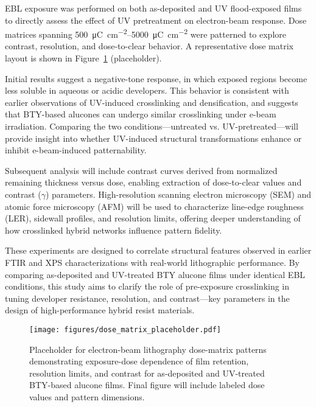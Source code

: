EBL exposure was performed on both as-deposited and UV flood-exposed films to directly assess the effect of UV pretreatment on electron-beam response. Dose matrices spanning \SIrange{500}{5000}{\micro\coulomb\per\centi\meter\squared} were patterned to explore contrast, resolution, and dose-to-clear behavior. A representative dose matrix layout is shown in Figure~\ref{fig:dose_matrix} (placeholder).

Initial results suggest a negative-tone response, in which exposed regions become less soluble in aqueous or acidic developers. This behavior is consistent with earlier observations of UV-induced crosslinking and densification, and suggests that BTY-based alucones can undergo similar crosslinking under e-beam irradiation. Comparing the two conditions—untreated vs. UV-pretreated—will provide insight into whether UV-induced structural transformations enhance or inhibit e-beam-induced patternability.

Subsequent analysis will include contrast curves derived from normalized remaining thickness versus dose, enabling extraction of dose-to-clear values and contrast (\(\gamma\)) parameters. High-resolution scanning electron microscopy (SEM) and atomic force microscopy (AFM) will be used to characterize line-edge roughness (LER), sidewall profiles, and resolution limits, offering deeper understanding of how crosslinked hybrid networks influence pattern fidelity.


These experiments are designed to correlate structural features observed in earlier FTIR and XPS characterizations with real-world lithographic performance. By comparing as-deposited and UV-treated BTY alucone films under identical EBL conditions, this study aims to clarify the role of pre-exposure crosslinking in tuning developer resistance, resolution, and contrast—key parameters in the design of high-performance hybrid resist materials.

\begin{figure}[ht]
  \centering
  \texttt{[image: figures/dose\_matrix\_placeholder.pdf]}
  \caption{Placeholder for electron-beam lithography dose-matrix patterns demonstrating exposure-dose dependence of film retention, resolution limits, and contrast for as-deposited and UV-treated BTY-based alucone films. Final figure will include labeled dose values and pattern dimensions.}
  \label{fig:dose_matrix}
\end{figure}


